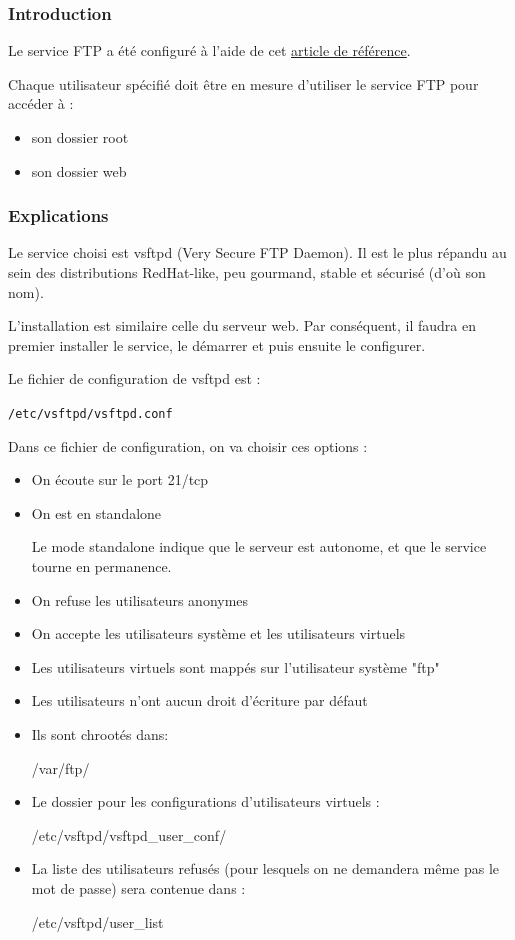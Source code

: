 \documentclass{article}
\begin{document}
	\subsubsection{Introduction}
	Le service FTP a été configuré à l'aide de cet \href{https://doc.fedora-fr.org/wiki/Vsftpd_:_Installation_et_configuration}{\underline{article de référence}}.

	Chaque utilisateur spécifié doit être en mesure d'utiliser le service FTP pour accéder à :
	\begin{itemize}
		\item son dossier root
		\item son dossier web
	\end{itemize}

	\subsubsection{Explications}
	
	Le service choisi est vsftpd (Very Secure FTP Daemon). Il est le plus répandu au sein des distributions RedHat-like, peu gourmand, stable et sécurisé (d'où son nom).
	
	L'installation est similaire  celle du serveur web. Par conséquent, il faudra en premier installer le service, le démarrer et puis ensuite le configurer.
	
	Le fichier de configuration de vsftpd est : 
	\begin{center}
			\texttt{/etc/vsftpd/vsftpd.conf}
	\end{center}

	Dans ce fichier de configuration, on va choisir ces options :
	\begin{itemize}
	\item On écoute sur le port 21/tcp 
    \item On est en standalone 
    
Le mode standalone indique que le serveur est autonome, et que le service tourne en permanence. 
    \item On refuse les utilisateurs anonymes 
    \item On accepte les utilisateurs système et les utilisateurs virtuels 
    \item Les utilisateurs virtuels sont mappés sur l'utilisateur système "ftp" 
    \item Les utilisateurs n'ont aucun droit d'écriture par défaut 
    \item Ils sont chrootés dans:
    \begin{center}
		/var/ftp/
	\end{center}
    \item Le dossier pour les configurations d'utilisateurs virtuels :
    \begin{center}
 		/etc/vsftpd/vsftpd\_user\_conf/
	\end{center}
    \item La liste des utilisateurs refusés (pour lesquels on ne demandera même pas le mot de passe) sera contenue dans :
	\begin{center}
		/etc/vsftpd/user\_list
	\end{center}		
	\end{itemize}
	
\end{document}
